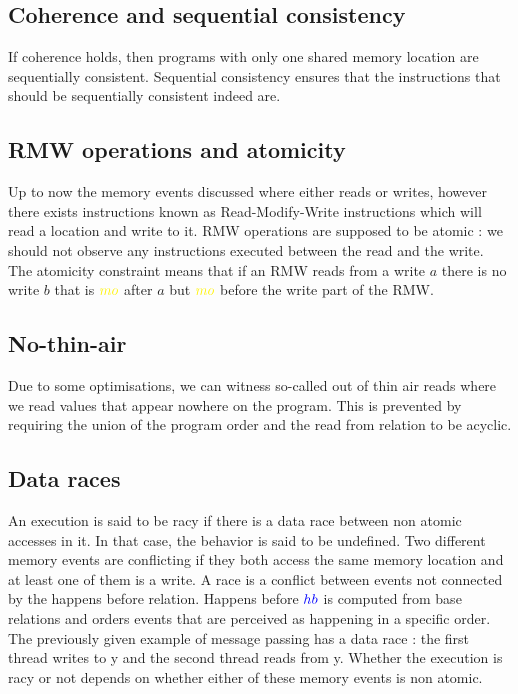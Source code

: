 \documentclass[a4,12pt]{article}
\newcommand{\hb}{{\color{blue}hb}}
\newcommand{\mo}{{\color{Yellow}mo}}
\begin{document}
\subsection{Coherence and sequential consistency}

If coherence holds, then programs with only one shared memory location are sequentially consistent. Sequential consistency ensures that the instructions that should be sequentially consistent indeed are.

\subsection{RMW operations and atomicity}

Up to now the memory events discussed where either reads or writes, however there exists instructions known as Read-Modify-Write instructions which will read a location and write to it. RMW operations are supposed to be atomic : we should not observe any instructions executed between the read and the write. The atomicity constraint means that if an RMW reads from a write $a$ there is no write $b$ that is $\mo$ after $a$ but $\mo$ before the write part of the RMW.

\subsection{No-thin-air}

Due to some optimisations, we can witness so-called out of thin air reads where we read values that appear nowhere on the program. This is prevented by requiring the union of the program order and the read from relation to be acyclic.

\subsection{Data races}

An execution is said to be racy if there is a data race between non atomic accesses in it. In that case, the behavior is said to be undefined. Two different memory events are conflicting if they both access the same memory location and at least one of them is a write. A race is a conflict between events not connected by the happens before relation. Happens before $\hb$ is computed from base relations and orders events that are perceived as happening in a specific order.
The previously given example of message passing has a data race : the first thread writes to y and the second thread reads from y. Whether the execution is racy or not depends on whether either of these memory events is non atomic.
\end{document}
